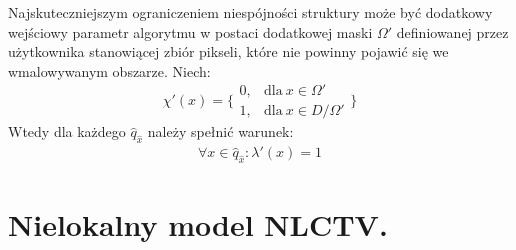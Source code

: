 \documentclass[12pt, twoside, openany]{report}
\theoremstyle{definition}
\begin{document}
Najskuteczniejszym ograniczeniem niespójności struktury może być dodatkowy wejściowy parametr algorytmu w postaci dodatkowej maski $\Omega '$ definiowanej przez użytkownika stanowiącej zbiór pikseli, które nie powinny pojawić się we wmalowywanym obszarze. Niech:
\begin{equation}
\chi' \left(x\right)=\Bigg\{ \begin{array}{ll}
0, & \text{dla} \ x \in \Omega' \\ 
1, & \text{dla} \ x \in D/ \Omega' \end{array}
\Bigg\}
\end{equation}
Wtedy dla każdego $\hat{q}_{\hat{x}}$ należy spełnić warunek:
\begin{align}
\forall x \in \hat{q}_{\hat{x}} : {\lambda }'(x) = 1
\end{align}
\section{Nielokalny model NLCTV.}
\end{document}
